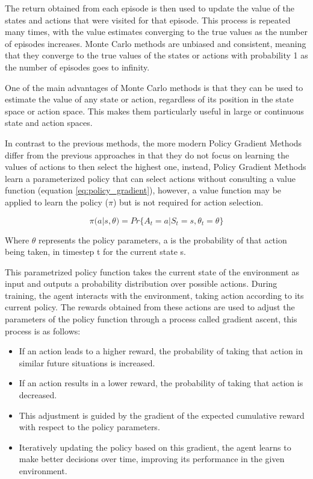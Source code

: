 The return obtained from each episode is then used to update the value of the states and actions that were visited for that episode. This process is repeated many times, with the value estimates converging to the true values as the number of episodes increases. Monte Carlo methods are unbiased and consistent, meaning that they converge to the true values of the states or actions with probability 1 as the number of episodes goes to infinity.

One of the main advantages of Monte Carlo methods is that they can be used to estimate the value of any state or action, regardless of its position in the state space or action space. This makes them particularly useful in large or continuous state and action spaces.

In contrast to the previous methods, the more modern Policy Gradient Methods differ from the previous approaches in that they do not focus on learning the values of actions to then select the highest one, instead, Policy Gradient Methods learn a parameterized policy that can select actions without consulting a value function (equation \ref{eq:policy_gradient}), however, a value function may be applied to learn the policy ($\pi$) but is not required for action selection.

\begin{equation}
    \label{eq:policy_gradient}
    \pi(a|s,\theta) = Pr\{A_t=a | S_t=s, \theta_t=\theta\}
\end{equation}

Where $\theta$ represents the policy parameters, a is the probability of that action being taken, in timestep t for the current state s.

This parametrized policy function takes the current state of the environment as input and outputs a probability distribution over possible actions. During training, the agent interacts with the environment, taking action according to its current policy. The rewards obtained from these actions are used to adjust the parameters of the policy function through a process called gradient ascent, this process is as follows:

\begin{itemize}
    \item If an action leads to a higher reward, the probability of taking that action in similar future situations is increased.
    \item If an action results in a lower reward, the probability of taking that action is decreased.
    \item This adjustment is guided by the gradient of the expected cumulative reward with respect to the policy parameters.
    \item Iteratively updating the policy based on this gradient, the agent learns to make better decisions over time, improving its performance in the given environment.
\end{itemize}

